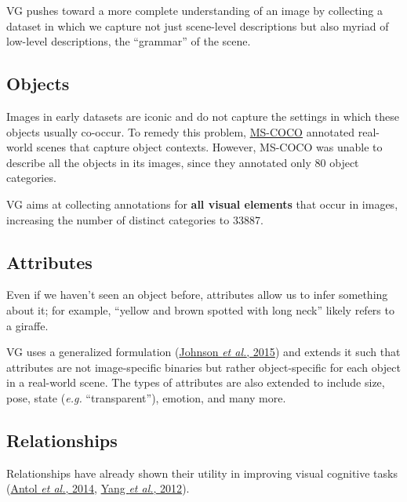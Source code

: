 \documentclass[10pt]{article}
\begin{document}
VG pushes toward a more complete understanding of an image by collecting a
dataset in which we capture not just scene-level descriptions but also myriad
of low-level descriptions, the ``grammar'' of the scene.

\subsection{Objects}%
\label{sec:objects}
Images in early datasets are iconic and do not capture the settings in which
these objects usually co-occur. To remedy this problem,
\href{http://cocodataset.org/#home}{MS-COCO} annotated real-world scenes that
capture object contexts. However, MS-COCO was unable to describe all the
objects in its images, since they annotated only 80 object categories.

VG aims at collecting annotations for \textbf{all visual elements} that occur
in images, increasing the number of distinct categories to 33887.

\subsection{Attributes}%
\label{sec:attributes}
Even if we haven't seen an object before, attributes allow us to infer
something about it; for example, ``yellow and brown spotted with long neck''
likely refers to a giraffe.

VG uses a generalized formulation
(\href{https://cs.stanford.edu/people/jcjohns/papers/cvpr2015/JohnsonCVPR2015.pdf}
{Johnson \textit{et al.}, 2015}) and extends it such that attributes are not
image-specific binaries but rather object-specific for each object in a
real-world scene. The types of attributes are also extended to include size,
pose, state (\textit{e.g.} ``transparent''), emotion, and many more.

\subsection{Relationships}%
\label{sec:relationships}
Relationships have already shown their utility in improving visual cognitive
tasks (\href{https://computing.ece.vt.edu/~santol/projects/zsl_via_visual_abstraction/}
{Antol \textit{et al.}, 2014},
\href{https://www.cs.cmu.edu/~deva/software/proxemics/index.html}
{Yang \textit{et al.}, 2012}).
\end{document}
